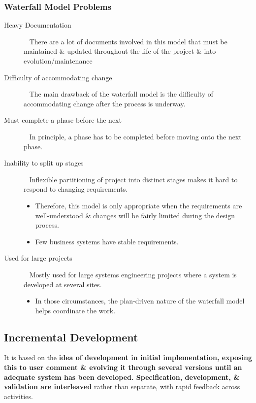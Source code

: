 \documentclass{report}
\begin{document}
\subsubsection{Waterfall Model Problems}
\begin{description}
  \item [Heavy Documentation] \ \newline
  There are a lot of documents involved in this model that must be maintained \& updated throughout the life of the project \& into evolution/maintenance
  \item [Difficulty of accommodating change] \ \newline
  The main drawback of the waterfall model is the difficulty of accommodating change after the process is underway.
  \item [Must complete a phase before the next] \ \newline 
  In principle, a phase has to be completed before moving onto the next phase.
  \item [Inability to split up stages] \ \newline
  Inflexible partitioning of project into distinct stages makes it hard to respond to changing requirements.
  \begin{itemize}
    \item Therefore, this model is only appropriate when the requirements are well-understood \& changes will be fairly limited during the design process.
    \item Few business systems have stable requirements.
  \end{itemize}
  \item [Used for large projects] \ \newline
   Mostly used for large systems engineering projects where a system is developed at several sites.
  \begin{itemize}
    \item In those circumstances, the plan-driven nature of the waterfall model helps coordinate the work.
  \end{itemize}
\end{description}

\newpage
\subsection{Incremental Development}
It is based on the \textbf{idea of development in initial implementation, exposing this to user comment \& evolving it through several versions until an adequate system has been developed. Specification, development, \& validation are interleaved} rather than separate, with rapid feedback across activities.
\end{document}
